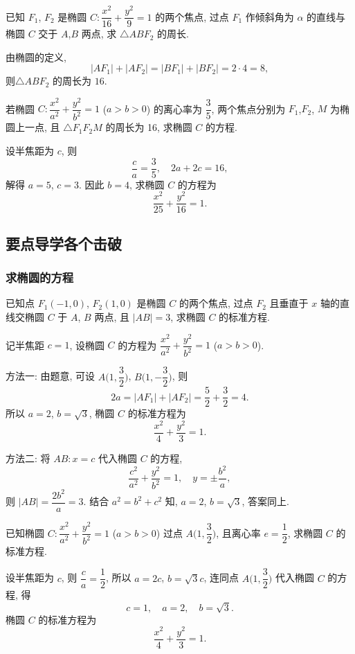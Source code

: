 \begin{exercise}
    已知 $F_1$, $F_2$ 是椭圆 $C\colon \dfrac{x^2}{16}+\dfrac{y^2}{9}=1$ 的两个焦点, 过点 $F_1$ 作倾斜角为 $\alpha$ 的直线与椭圆 $C$ 交于 $A$,$B$ 两点, 求 $\triangle ABF_2$ 的周长.
\end{exercise}
\beginsolution
    由椭圆的定义,
    \[|AF_1|+ |AF_2|= |BF_1|+ |BF_2|= 2\cdot 4= 8,\]
    则$\triangle ABF_2$ 的周长为 $16$.
\endsolution

\begin{exercise}
    若椭圆 $C\colon \dfrac{x^2}{a^2}+\dfrac{y^2}{b^2}=1$ ($a>b>0$) 的离心率为 $\dfrac35$, 两个焦点分别为 $F_1$,$F_2$, $M$ 为椭圆上一点, 且 $\triangle F_1 F_2 M$ 的周长为 16, 求椭圆 $C$ 的方程.
\end{exercise}
\beginsolution
    设半焦距为 $c$, 则
    \[\frac{c}{a}= \frac35,\quad 2a+2c= 16,\]
    解得 $a=5$, $c=3$. 因此 $b=4$, 求椭圆 $C$ 的方程为
    \[\frac{x^2}{25}+\frac{y^2}{16}= 1.\]
\endsolution

\subsection{要点导学\quad 各个击破}
\subsubsection{求椭圆的方程}
\begin{example}
    已知点 $F_1(-1,0)$, $F_2(1,0)$ 是椭圆 $C$ 的两个焦点, 过点 $F_2$ 且垂直于 $x$ 轴的直线交椭圆 $C$ 于 $A$, $B$ 两点, 且 $|AB|=3$, 求椭圆 $C$ 的标准方程.
\end{example}
\beginsolution
    记半焦距 $c=1$, 设椭圆 $C$ 的方程为 $\dfrac{x^2}{a^2}+\dfrac{y^2}{b^2}=1$ ($a>b>0$).

    方法一: 由题意, 可设 $A\biggl(1,\dfrac32\biggr)$, $B\biggl(1,-\dfrac32\biggr)$, 则
    \[2a= |AF_1|+ |AF_2|= \frac52+ \frac32= 4.\]
    所以 $a=2$, $b=\sqrt3$, 椭圆 $C$ 的标准方程为
    \[\frac{x^2}{4}+\frac{y^2}{3}= 1.\]

    方法二: 将 $AB\colon x=c$ 代入椭圆 $C$ 的方程,
    \[\frac{c^2}{a^2}+ \frac{y^2}{b^2}= 1,\quad
    y= \pm\frac{b^2}{a},\]
    则 $|AB|= \dfrac{2b^2}a= 3$. 结合 $a^2= b^2+c^2$ 知, $a=2$, $b=\sqrt3$, 答案同上.
\endsolution

\begin{example}
    已知椭圆 $C\colon \dfrac{x^2}{a^2}+\dfrac{y^2}{b^2}=1$ ($a>b>0$) 过点 $A\Big(1,\dfrac32\Big)$, 且离心率 $e=\dfrac12$, 求椭圆 $C$ 的标准方程.
\end{example}
\beginsolution
    设半焦距为 $c$, 则 $\dfrac{c}a= \dfrac12$, 所以 $a=2c$, $b=\sqrt3c$, 连同点 $A\Big(1,\dfrac32\Big)$ 代入椭圆 $C$ 的方程, 得
    \[c=1,\quad a=2,\quad b=\sqrt3.\]
    椭圆 $C$ 的标准方程为
    \[\frac{x^2}{4}+\frac{y^2}{3}= 1.\]
\endsolution

